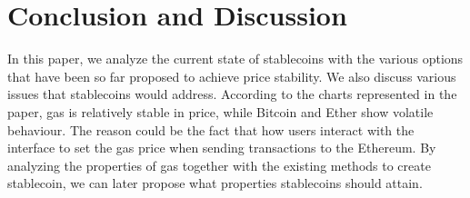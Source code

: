 

\section{Conclusion and Discussion}
In this paper, we analyze the current state of stablecoins with the various options that have been so far proposed to achieve price stability. We also discuss various issues that stablecoins would address. According to the charts represented in the paper, gas is relatively stable in price, while Bitcoin and Ether show volatile behaviour. The reason could be the fact that how users interact with the interface to set the gas price when sending transactions to the Ethereum. By analyzing the properties of gas together with the existing methods to create stablecoin, we can later propose what properties stablecoins should attain.




